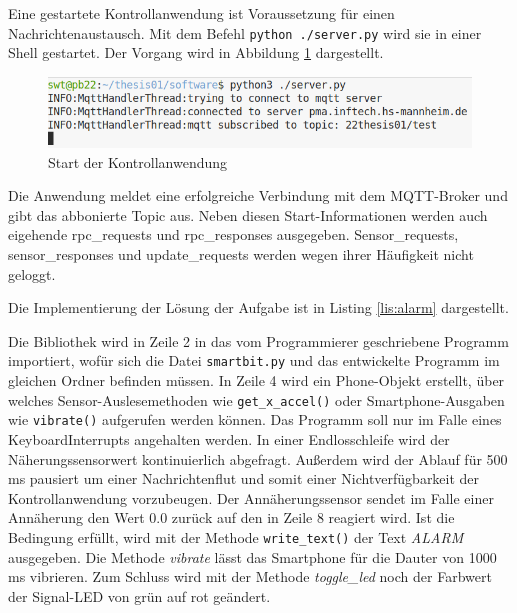 \documentclass[11pt,a4paper]{report}
\begin{document}
Eine gestartete Kontrollanwendung ist Voraussetzung für einen Nachrichtenaustausch.
Mit dem Befehl \texttt{python ./server.py} wird sie in einer Shell gestartet.
Der Vorgang wird in Abbildung \ref{fig:start_controll_app} dargestellt.
\begin{figure}[htbp]
  \centering
  \includegraphics[width=.8\textwidth]{images/server_logging}
  \caption{Start der Kontrollanwendung}
  \label{fig:start_controll_app}
\end{figure}
Die Anwendung meldet eine erfolgreiche Verbindung mit dem MQTT-Broker und gibt das abbonierte Topic aus.
Neben diesen Start-Informationen werden auch eigehende rpc\_requests und rpc\_responses ausgegeben.
Sensor\_requests, sensor\_responses und update\_requests werden wegen ihrer Häufigkeit nicht geloggt.

Die Implementierung der Lösung der Aufgabe ist in Listing \ref{lis:alarm} dargestellt.
\lstset{language=python, captionpos=b, frame=single, numberstyle=\tiny, style=customcs}

Die Bibliothek wird in Zeile 2 in das vom Programmierer geschriebene Programm importiert, wofür sich die Datei \texttt{smartbit.py} und das entwickelte Programm im gleichen Ordner befinden müssen.
In Zeile 4 wird ein Phone-Objekt erstellt, über welches Sensor-Auslesemethoden wie \texttt{get\_x\_accel()} oder Smartphone-Ausgaben wie \texttt{vibrate()} aufgerufen werden können.
Das Programm soll nur im Falle eines KeyboardInterrupts angehalten werden.
In einer Endlosschleife wird der Näherungssensorwert kontinuierlich abgefragt.
Außerdem wird der Ablauf für 500 ms pausiert um einer Nachrichtenflut und somit einer Nichtverfügbarkeit der Kontrollanwendung vorzubeugen.
Der Annäherungssensor sendet im Falle einer Annäherung den Wert 0.0 zurück auf den in Zeile 8 reagiert wird.
Ist die Bedingung erfüllt, wird mit der Methode \texttt{write\_text()} der Text \textit{ALARM} ausgegeben.
Die Methode \textit{vibrate} lässt das Smartphone für die Dauter von 1000 ms vibrieren.
Zum Schluss wird mit der Methode \textit{toggle\_led} noch der Farbwert der Signal-LED von grün auf rot geändert.
\end{document}
